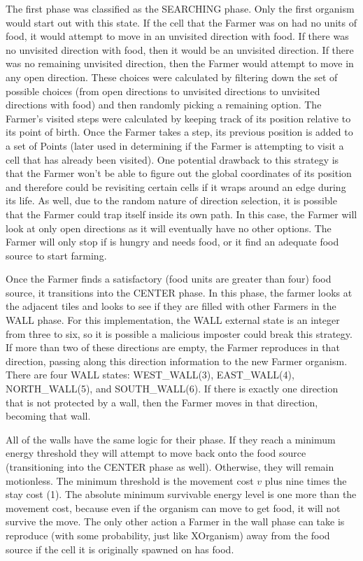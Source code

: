 \documentclass[
10pt, %
letterpaper, %
oneside, %
headinclude,footinclude, %
english
]{article}
\begin{document}
The first phase was classified as the SEARCHING phase. Only the first organism would start out with this state. If the cell that the Farmer was on had no units of food, it would attempt to move in an unvisited direction with food. If there was no unvisited direction with food, then it would be an unvisited direction. If there was no remaining unvisited direction, then the Farmer would attempt to move in any open direction. These choices were calculated by filtering down the set of possible choices (from open directions to unvisited directions to unvisited directions with food) and then randomly picking a remaining option. The Farmer's visited steps were calculated by keeping track of its position relative to its point of birth. Once the Farmer takes a step, its previous position is added to a set of Points (later used in determining if the Farmer is attempting to visit a cell that has already been visited). One potential drawback to this strategy is that the Farmer won't be able to figure out the global coordinates of its position and therefore could be revisiting certain cells if it wraps around an edge during its life. As well, due to the random nature of direction selection, it is possible that the Farmer could trap itself inside its own path. In this case, the Farmer will look at only open directions as it will eventually have no other options. The Farmer will only stop if is hungry and needs food, or it find an adequate food source to start farming.

Once the Farmer finds a satisfactory (food units are greater than four) food source, it transitions into the CENTER phase. In this phase, the farmer looks at the adjacent tiles and looks to see if they are filled with other Farmers in the WALL phase. For this implementation, the WALL external state is an integer from three to six, so it is possible a malicious imposter could break this strategy. If more than two of these directions are empty, the Farmer reproduces in that direction, passing along this direction information to the new Farmer organism. There are four WALL states: WEST\_WALL(3), EAST\_WALL(4), NORTH\_WALL(5), and SOUTH\_WALL(6). If there is exactly one direction that is not protected by a wall, then the Farmer moves in that direction, becoming that wall.

All of the walls have the same logic for their phase. If they reach a minimum energy threshold they will attempt to move back onto the food source (transitioning into the CENTER phase as well). Otherwise, they will remain motionless. The minimum threshold is the movement cost $v$ plus nine times the stay cost (1). The absolute minimum survivable energy level is one more than the movement cost, because even if the organism can move to get food, it will not survive the move. The only other action a Farmer in the wall phase can take is reproduce (with some probability, just like XOrganism) away from the food source if the cell it is originally spawned on has food.
\end{document}
